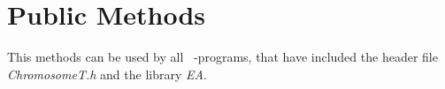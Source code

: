 \section{Public Methods}

This methods can be used by all \cpp\ -programs, that have included
the header file {\em ChromosomeT.h} and the library {\em EA}.

\vspace*{4ex}


\vspace*{4ex}


\clearpage


\vspace*{4ex}


\vspace*{4ex}


\vspace*{4ex}


\vspace*{4ex}


